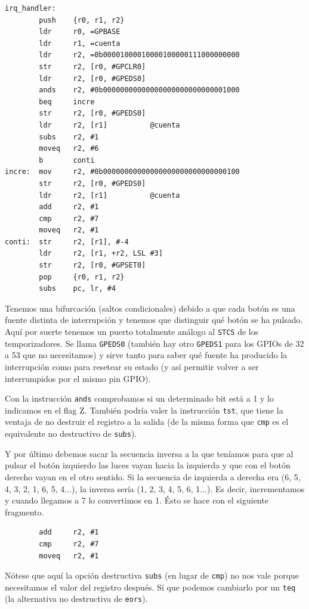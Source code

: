 \begin{lstlisting}
irq_handler:
        push    {r0, r1, r2}
        ldr     r0, =GPBASE
        ldr     r1, =cuenta
        ldr     r2, =0b00001000010000100000111000000000
        str     r2, [r0, #GPCLR0]
        ldr     r2, [r0, #GPEDS0]
        ands    r2, #0b00000000000000000000000000001000
        beq     incre
        str     r2, [r0, #GPEDS0]
        ldr     r2, [r1]          @cuenta
        subs    r2, #1
        moveq   r2, #6
        b       conti
incre:  mov     r2, #0b00000000000000000000000000000100
        str     r2, [r0, #GPEDS0]
        ldr     r2, [r1]          @cuenta
        add     r2, #1
        cmp     r2, #7
        moveq   r2, #1
conti:  str     r2, [r1], #-4
        ldr     r2, [r1, +r2, LSL #3]
        str     r2, [r0, #GPSET0]
        pop     {r0, r1, r2}
        subs    pc, lr, #4
\end{lstlisting}

Tenemos una bifurcación (saltos condicionales) debido a que cada botón es una fuente distinta
de interrupción y tenemos que distinguir qué botón se ha pulsado. Aquí por suerte tenemos
un puerto totalmente análogo al {\tt STCS} de los temporizadores. Se llama {\tt GPEDS0}
(también hay otro {\tt GPEDS1} para los GPIOs de 32 a 53 que no necesitamos) y sirve tanto
para saber qué fuente ha producido la interrupción como para resetear su estado (y así permitir
volver a ser interrumpidos por el mismo pin GPIO).

Con la instrucción {\tt ands} comprobamos si un determinado bit está a 1 y lo indicamos en el
flag Z. También podría valer la instrucción {\tt tst}, que tiene la ventaja de no destruir
el registro a la salida (de la misma forma que {\tt cmp} es el equivalente no destructivo de
{\tt subs}).

Y por último debemos sacar la secuencia inversa a la que teníamos para que al pulsar el
botón izquierdo las luces vayan hacia la izquierda y que con el botón derecho vayan en el otro
sentido. Si la secuencia de izquierda a derecha era  (6, 5, 4, 3, 2, 1, 6, 5, 4...), la
inversa sería (1, 2, 3, 4, 5, 6, 1...). Es decir, incrementamos y cuando llegamos a 7
lo convertimos en 1. Ésto se hace con el siguiente fragmento.

\begin{lstlisting}
        add     r2, #1
        cmp     r2, #7
        moveq   r2, #1
\end{lstlisting}

Nótese que aquí la opción destructiva {\tt subs} (en lugar de {\tt cmp}) no nos vale porque
necesitamos el valor del registro después. Sí que podemos cambiarlo por un {\tt teq} (la
alternativa no destructiva de {\tt eors}).

